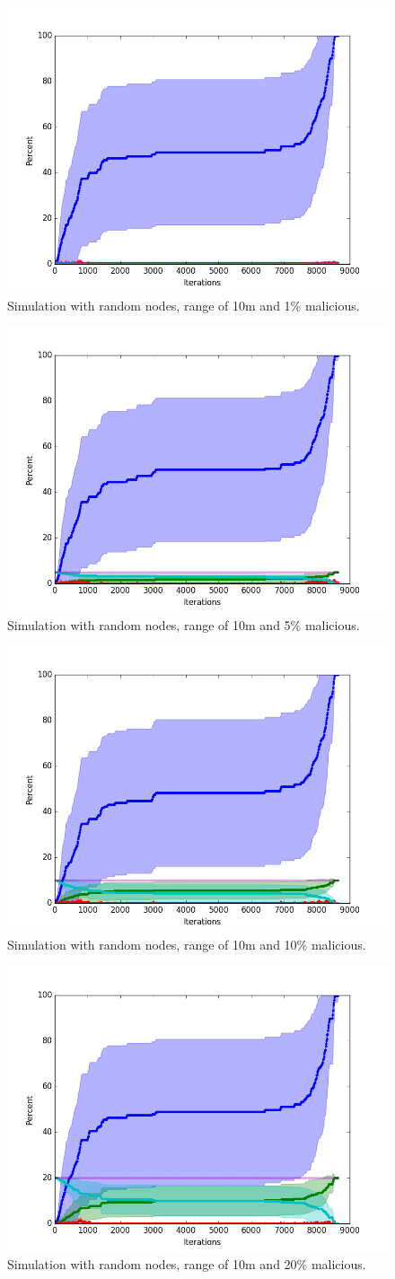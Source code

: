 \documentclass[conference]{IEEEtran}
\begin{document}

\begin{figure}
\centering
\includegraphics[width=0.5\linewidth]{Network_rA/10_1}
\caption{Simulation with random nodes, range of 10m and 1\% malicious.} \label{fig:random0}
\end{figure}

\begin{figure}
\centering
\includegraphics[width=0.5\linewidth]{Network_rA/10_5}
\caption{Simulation with random nodes, range of 10m and 5\% malicious.} \label{fig:random1}
\end{figure}

\begin{figure}
\centering
\includegraphics[width=0.5\linewidth]{Network_rA/10_10}
\caption{Simulation with random nodes, range of 10m and 10\% malicious.} \label{fig:random2}
\end{figure}

\begin{figure}
\centering
\includegraphics[width=0.5\linewidth]{Network_rA/10_20}
\caption{Simulation with random nodes, range of 10m and 20\% malicious.} \label{fig:random3}
\end{figure}
\end{document}
